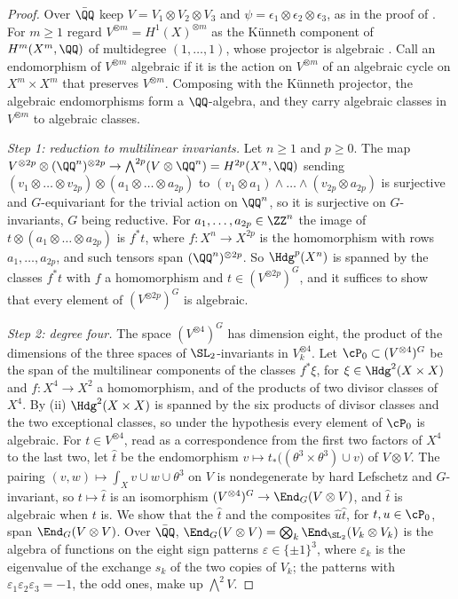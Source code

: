 \begin{proof}
Over $\bar{\QQ}$ keep $V=V_{1}\otimes V_{2}\otimes V_{3}$ and
$\psi=\epsilon_{1}\otimes\epsilon_{2}\otimes\epsilon_{3}$, as in the proof of
. For $m\ge1$ regard $V^{\otimes m}=H^{1}(X)^{\otimes m}$
as the K\"unneth component of $H^{m}(X^{m},\QQ)$ of multidegree
$(1,\dots,1)$, whose projector is algebraic \cite[\S2]{Kle68}. Call an
endomorphism of $V^{\otimes m}$ algebraic if it is the action on
$V^{\otimes m}$ of an algebraic cycle on $X^{m}\times X^{m}$ that preserves
$V^{\otimes m}$. Composing with the K\"unneth projector, the algebraic
endomorphisms form a $\QQ$-algebra, and they carry algebraic classes in
$V^{\otimes m}$ to algebraic classes.

\emph{Step 1: reduction to multilinear invariants.} Let $n\ge1$ and $p\ge0$.
The map $V^{\otimes2p}\otimes(\QQ^{n})^{\otimes2p}\to
\bigwedge^{2p}(V\otimes\QQ^{n})=H^{2p}(X^{n},\QQ)$ sending
$(v_{1}\otimes\dots\otimes v_{2p})\otimes(a_{1}\otimes\dots\otimes a_{2p})$ to
$(v_{1}\otimes a_{1})\wedge\dots\wedge(v_{2p}\otimes a_{2p})$ is surjective
and $G$-equivariant for the trivial action on $\QQ^{n}$, so it is surjective
on $G$-invariants, $G$ being reductive. For $a_{1},\dots,a_{2p}\in\ZZ^{n}$
the image of $t\otimes(a_{1}\otimes\dots\otimes a_{2p})$ is $f^{*}t$, where
$f\colon X^{n}\to X^{2p}$ is the homomorphism with rows $a_{1},\dots,a_{2p}$,
and such tensors span $(\QQ^{n})^{\otimes2p}$. So $\Hdg^{p}(X^{n})$ is
spanned by the classes $f^{*}t$ with $f$ a homomorphism and
$t\in(V^{\otimes2p})^{G}$, and it suffices to show that every element of
$(V^{\otimes2p})^{G}$ is algebraic.

\emph{Step 2: degree four.} The space $(V^{\otimes4})^{G}$ has dimension
eight, the product of the dimensions of the three spaces of
$\SL_{2}$-invariants in $V_{k}^{\otimes4}$. Let $\cP_{0}\subset
(V^{\otimes4})^{G}$ be the span of the multilinear components of the classes
$f^{*}\xi$, for $\xi\in\Hdg^{2}(X\times X)$ and $f\colon X^{4}\to X^{2}$ a
homomorphism, and of the products of two divisor classes of $X^{4}$. By
(ii) $\Hdg^{2}(X\times X)$ is spanned by the six
products of divisor classes and the two exceptional classes, so under the
hypothesis every element of $\cP_{0}$ is algebraic. For
$t\in V^{\otimes4}$, read as a correspondence from the first two factors of
$X^{4}$ to the last two, let $\hat{t}$ be the endomorphism
$v\mapsto t_{*}\bigl((\theta^{3}\times\theta^{3})\cup v\bigr)$ of
$V\otimes V$. The pairing $(v,w)\mapsto\int_{X}v\cup w\cup\theta^{3}$ on $V$
is nondegenerate by hard Lefschetz and $G$-invariant, so $t\mapsto\hat{t}$
is an isomorphism $(V^{\otimes4})^{G}\to\End_{G}(V\otimes V)$, and $\hat{t}$
is algebraic when $t$ is. We show that the $\hat{t}$ and the composites
$\hat{u}\hat{t}$, for $t,u\in\cP_{0}$, span $\End_{G}(V\otimes V)$. Over
$\bar{\QQ}$, $\End_{G}(V\otimes V)=\bigotimes_{k}\End_{\SL_{2}}(V_{k}\otimes
V_{k})$ is the algebra of functions on the eight sign patterns
$\varepsilon\in\{\pm1\}^{3}$, where $\varepsilon_{k}$ is the eigenvalue of the
exchange $s_{k}$ of the two copies of $V_{k}$; the patterns with
$\varepsilon_{1}\varepsilon_{2}\varepsilon_{3}=-1$, the odd ones, make up
$\bigwedge^{2}V$.


\end{proof}

